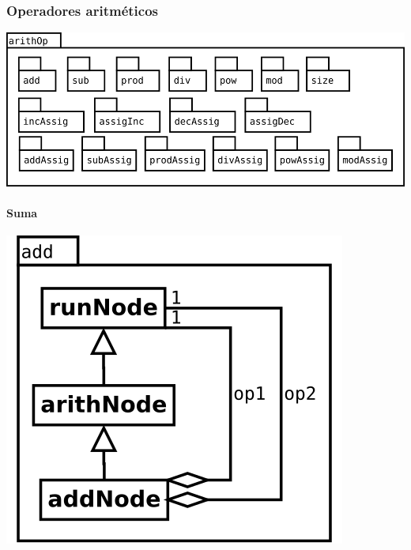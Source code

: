 \pagebreak
\subsubsection {Operadores aritméticos}
\begin{center}
\includegraphics[scale=0.4]{arithOp-package.png} \\
\end{center}

\paragraph {Suma}
\begin{center}
\includegraphics[scale=0.4]{add.png} \\
\end{center}

